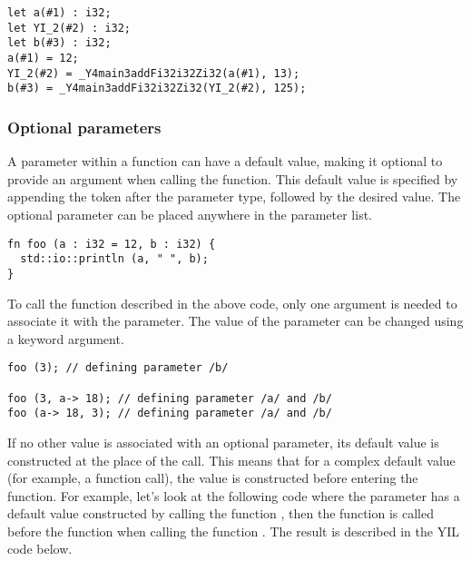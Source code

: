 \begin{lstlisting}[style=intermediateVerb]
let a(#1) : i32;
let YI_2(#2) : i32;
let b(#3) : i32;
a(#1) = 12;
YI_2(#2) = _Y4main3addFi32i32Zi32(a(#1), 13);
b(#3) = _Y4main3addFi32i32Zi32(YI_2(#2), 125);
\end{lstlisting}


\subsubsection*{Optional parameters}

A parameter within a function can have a default value, making it optional to
provide an argument when calling the function. This default value is specified
by appending the \token{=} token after the parameter type, followed by the
desired value. The optional parameter can be placed anywhere in the parameter
list.
\bigskip

\begin{lstlisting}[style=coloredverbatim]
fn foo (a : i32 = 12, b : i32) {
  std::io::println (a, " ", b);
}
\end{lstlisting}

To call the  function described in the above code, only one argument
is needed to associate it with the  parameter. The value of the
parameter can be changed using a keyword argument.

\begin{lstlisting}[style=coloredverbatim]
foo (3); // defining parameter /b/

foo (3, a-> 18); // defining parameter /a/ and /b/
foo (a-> 18, 3); // defining parameter /a/ and /b/
\end{lstlisting}

If no other value is associated with an optional parameter, its default value is
constructed at the place of the call. This means that for a complex default
value (for example, a function call), the value is constructed before entering
the function. For example, let's look at the following code where the parameter
 has a default value constructed by calling the function ,
then the function  is called before the function  when
calling the function . The result is described in the YIL code
below.

